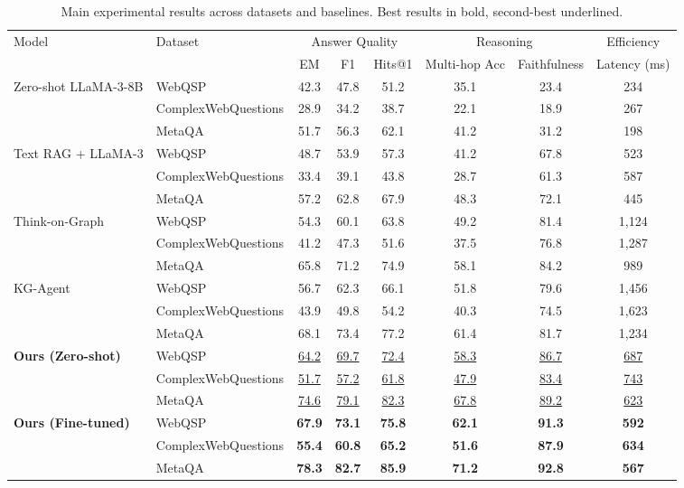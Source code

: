 \documentclass[conference]{IEEEtran}
\begin{document}
\begin{table}[t]
\centering
\caption{Main experimental results across datasets and baselines. Best results in bold, second-best underlined.}
\label{tab:qa_perf}
\begin{tabular}{llcccccc}
\toprule
\multirow{2}{*}{Model} & \multirow{2}{*}{Dataset} & \multicolumn{3}{c}{Answer Quality} & \multicolumn{2}{c}{Reasoning} & Efficiency \\
& & EM & F1 & Hits@1 & Multi-hop Acc & Faithfulness & Latency (ms) \\
\midrule
\multirow{3}{*}{Zero-shot LLaMA-3-8B} & WebQSP & 42.3 & 47.8 & 51.2 & 35.1 & 23.4 & 234 \\
& ComplexWebQuestions & 28.9 & 34.2 & 38.7 & 22.1 & 18.9 & 267 \\
& MetaQA & 51.7 & 56.3 & 62.1 & 41.2 & 31.2 & 198 \\
\midrule
\multirow{3}{*}{Text RAG + LLaMA-3} & WebQSP & 48.7 & 53.9 & 57.3 & 41.2 & 67.8 & 523 \\
& ComplexWebQuestions & 33.4 & 39.1 & 43.8 & 28.7 & 61.3 & 587 \\
& MetaQA & 57.2 & 62.8 & 67.9 & 48.3 & 72.1 & 445 \\
\midrule
\multirow{3}{*}{Think-on-Graph} & WebQSP & 54.3 & 60.1 & 63.8 & 49.2 & 81.4 & 1,124 \\
& ComplexWebQuestions & 41.2 & 47.3 & 51.6 & 37.5 & 76.8 & 1,287 \\
& MetaQA & 65.8 & 71.2 & 74.9 & 58.1 & 84.2 & 989 \\
\midrule
\multirow{3}{*}{KG-Agent} & WebQSP & 56.7 & 62.3 & 66.1 & 51.8 & 79.6 & 1,456 \\
& ComplexWebQuestions & 43.9 & 49.8 & 54.2 & 40.3 & 74.5 & 1,623 \\
& MetaQA & 68.1 & 73.4 & 77.2 & 61.4 & 81.7 & 1,234 \\
\midrule
\multirow{3}{*}{\textbf{Ours (Zero-shot)}} & WebQSP & \underline{64.2} & \underline{69.7} & \underline{72.4} & \underline{58.3} & \underline{86.7} & \underline{687} \\
& ComplexWebQuestions & \underline{51.7} & \underline{57.2} & \underline{61.8} & \underline{47.9} & \underline{83.4} & \underline{743} \\
& MetaQA & \underline{74.6} & \underline{79.1} & \underline{82.3} & \underline{67.8} & \underline{89.2} & \underline{623} \\
\midrule
\multirow{3}{*}{\textbf{Ours (Fine-tuned)}} & WebQSP & \textbf{67.9} & \textbf{73.1} & \textbf{75.8} & \textbf{62.1} & \textbf{91.3} & \textbf{592} \\
& ComplexWebQuestions & \textbf{55.4} & \textbf{60.8} & \textbf{65.2} & \textbf{51.6} & \textbf{87.9} & \textbf{634} \\
& MetaQA & \textbf{78.3} & \textbf{82.7} & \textbf{85.9} & \textbf{71.2} & \textbf{92.8} & \textbf{567} \\
\bottomrule
\end{tabular}
\end{table}
\end{document}
